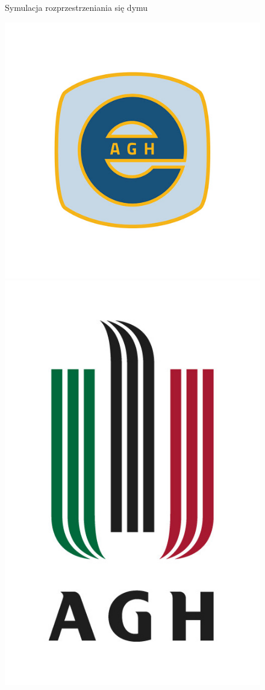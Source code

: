 \documentclass{article}
\date{}
\begin{document}
	\begin{figure}[h]
		\centering
		\Huge{Symulacja rozprzestrzeniania się dymu}
		\vspace{15mm}
		
		\includegraphics[scale = 0.23]{eaiib.jpg}
		\includegraphics[scale = 0.5]{agh.jpg}

\end{figure}
\end{document}

